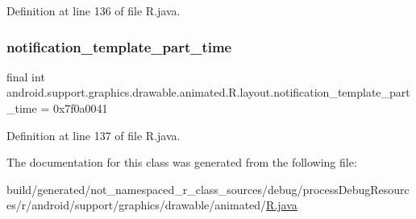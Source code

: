 Definition at line 136 of file R.\+java.

\mbox{\label{classandroid_1_1support_1_1graphics_1_1drawable_1_1animated_1_1_r_1_1layout_a58ea2615a1760f93ef687e8c1db58feb}} 
\subsubsection{\texorpdfstring{notification\_template\_part\_time}{notification\_template\_part\_time}}
{\footnotesize\ttfamily final int android.\+support.\+graphics.\+drawable.\+animated.\+R.\+layout.\+notification\+\_\+template\+\_\+part\+\_\+time = 0x7f0a0041\hspace{0.3cm}{\ttfamily [static]}}



Definition at line 137 of file R.\+java.



The documentation for this class was generated from the following file\+:\begin{DoxyCompactItemize}
\item 
build/generated/not\+\_\+namespaced\+\_\+r\+\_\+class\+\_\+sources/debug/process\+Debug\+Resources/r/android/support/graphics/drawable/animated/\mbox{\hyperlink{android_2support_2graphics_2drawable_2animated_2_r_8java}{R.\+java}}\end{DoxyCompactItemize}
